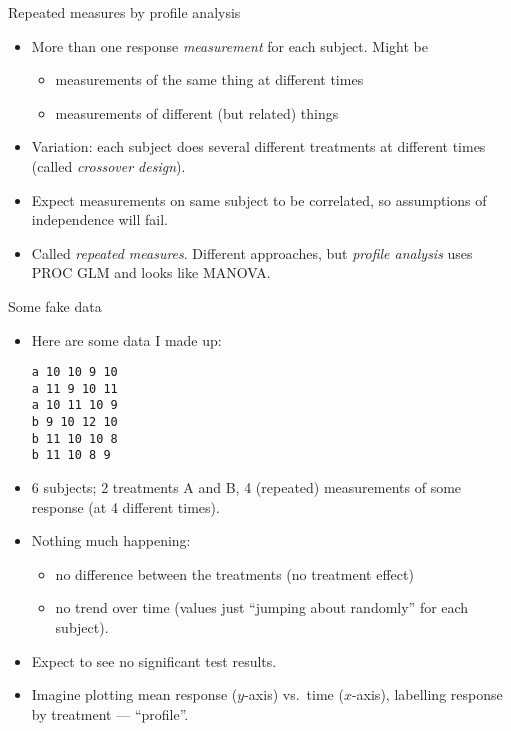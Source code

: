\documentclass[pdf]{prosper}
\begin{document}
\begin{slide}{Repeated measures by profile analysis}

  \begin{itemize}
  \item More than one response {\em measurement} for each subject. Might be
    \begin{itemize}
    \item measurements of the same thing at different times
    \item measurements of different (but related) things
    \end{itemize}
  \item Variation: each subject does several different treatments at different times (called {\em crossover design}).
  \item Expect measurements on same subject to be correlated, so
    assumptions of independence will fail.
  \item Called {\em repeated measures}. Different approaches, but {\em profile analysis} uses PROC GLM and looks like MANOVA.
  \end{itemize}
\end{slide}

  \begin{slide}{Some fake data}

    \begin{itemize}
    \item Here are some data I made up:

\begin{verbatim}
a 10 10 9 10
a 11 9 10 11
a 10 11 10 9
b 9 10 12 10
b 11 10 10 8
b 11 10 8 9
\end{verbatim}


    \item 6 subjects; 2 treatments A and B, 4 (repeated) measurements of some response (at 4 different times).
    \item Nothing much happening:
      \begin{itemize}
      \item no difference between the treatments (no treatment effect)
      \item no trend over time (values just ``jumping about randomly'' for each subject).
      \end{itemize}
    \item Expect to see no significant test results.
    \item Imagine plotting mean response ($y$-axis) vs.\ time ($x$-axis), labelling response by treatment --- ``profile''.


    \end{itemize}
    
  \end{slide}
\end{document}
